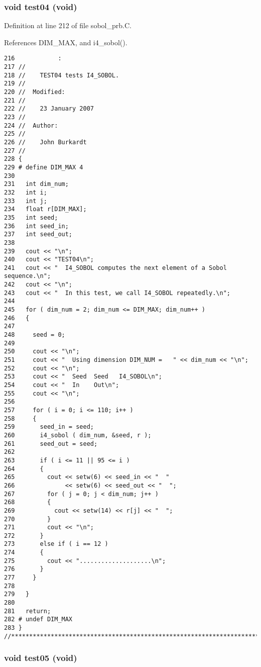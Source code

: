 \subsubsection{\setlength{\rightskip}{0pt plus 5cm}void test04 (void)}\label{sobol__prb_8C_4cf4862bad5a8714cb83b7c1d4623d11}




Definition at line 212 of file sobol\_\-prb.C.

References DIM\_\-MAX, and i4\_\-sobol().

\begin{Code}\begin{verbatim}216            :
217 //
218 //    TEST04 tests I4_SOBOL.
219 //
220 //  Modified:
221 //
222 //    23 January 2007
223 //
224 //  Author:
225 //
226 //    John Burkardt
227 //
228 {
229 # define DIM_MAX 4
230 
231   int dim_num;
232   int i;
233   int j;
234   float r[DIM_MAX];
235   int seed;
236   int seed_in;
237   int seed_out;
238 
239   cout << "\n";
240   cout << "TEST04\n";
241   cout << "  I4_SOBOL computes the next element of a Sobol sequence.\n";
242   cout << "\n";
243   cout << "  In this test, we call I4_SOBOL repeatedly.\n";
244 
245   for ( dim_num = 2; dim_num <= DIM_MAX; dim_num++ )
246   {
247 
248     seed = 0;
249 
250     cout << "\n";
251     cout << "  Using dimension DIM_NUM =   " << dim_num << "\n";
252     cout << "\n";
253     cout << "  Seed  Seed   I4_SOBOL\n";
254     cout << "  In    Out\n";
255     cout << "\n";
256 
257     for ( i = 0; i <= 110; i++ )
258     {
259       seed_in = seed;
260       i4_sobol ( dim_num, &seed, r );
261       seed_out = seed;
262 
263       if ( i <= 11 || 95 <= i )
264       {
265         cout << setw(6) << seed_in << "  "
266              << setw(6) << seed_out << "  ";
267         for ( j = 0; j < dim_num; j++ )
268         {
269           cout << setw(14) << r[j] << "  ";
270         }
271         cout << "\n";
272       }
273       else if ( i == 12 )
274       {
275         cout << "....................\n";
276       }
277     }
278 
279   }
280 
281   return;
282 # undef DIM_MAX
283 }
//****************************************************************************80
\end{verbatim}
\end{Code}


\subsubsection{\setlength{\rightskip}{0pt plus 5cm}void test05 (void)}\label{sobol__prb_8C_148dff40987bc494cc2f4aee07fd5bad}




